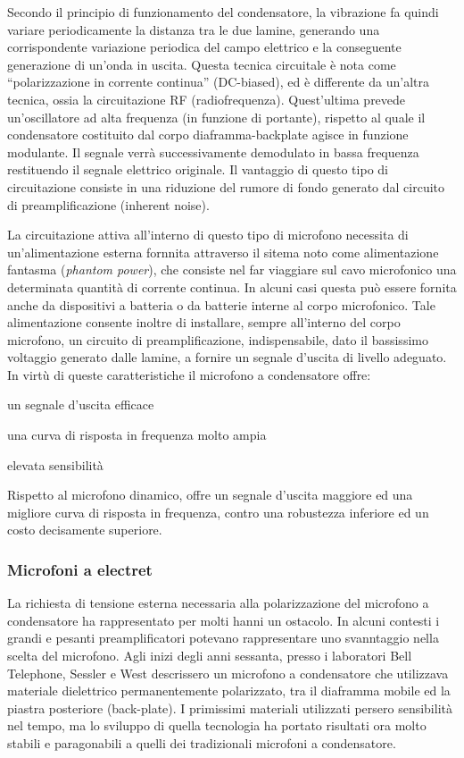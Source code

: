\begin{refsection}
Secondo il principio di funzionamento del condensatore, la vibrazione fa
quindi variare periodicamente la distanza tra le due lamine, generando una
corrispondente variazione periodica del campo elettrico e la conseguente
generazione di un’onda in uscita. Questa tecnica circuitale è nota come
“polarizzazione in corrente continua” (DC-biased), ed è differente da un’altra
tecnica, ossia la circuitazione RF (radiofrequenza). Quest’ultima prevede
un’oscillatore ad alta frequenza (in funzione di portante), rispetto al quale
il condensatore costituito dal corpo diaframma-backplate agisce in funzione
modulante. Il segnale verrà successivamente demodulato in bassa frequenza
restituendo il segnale elettrico originale. Il vantaggio di questo tipo di
circuitazione consiste in una riduzione del rumore di fondo generato dal
circuito di preamplificazione (inherent noise).

La circuitazione attiva all'interno di questo tipo di microfono necessita di
un'alimentazione esterna fornnita attraverso il sitema noto come alimentazione
fantasma (\emph{phantom power}), che consiste nel far viaggiare sul
cavo microfonico una determinata quantità di corrente continua. In alcuni casi
questa può essere fornita anche da dispositivi a batteria o da batterie interne
al corpo microfonico. Tale alimentazione consente inoltre di installare,
sempre all’interno del corpo microfono, un circuito di preamplificazione,
indispensabile, dato il bassissimo voltaggio generato dalle lamine, a fornire
un segnale d’uscita di livello adeguato.
In virtù di queste caratteristiche il microfono a condensatore offre:

\begin{compactitem}
  \item un segnale d'uscita efficace
  \item una curva di risposta in frequenza molto ampia
  \item elevata sensibilità
\end{compactitem}

Rispetto al microfono dinamico, offre un segnale d’uscita maggiore ed una migliore curva di
risposta in frequenza, contro una robustezza inferiore ed un costo decisamente superiore.

\subsubsection{Microfoni a electret}

La richiesta di tensione esterna necessaria alla polarizzazione del microfono a
condensatore ha rappresentato per molti hanni un ostacolo. In alcuni
contesti i grandi e pesanti preamplificatori potevano rappresentare uno svanntaggio
nella scelta del microfono. Agli inizi degli anni sessanta, presso i laboratori
Bell Telephone, Sessler e West descrissero un microfono a condensatore che utilizzava
materiale dielettrico permanentemente polarizzato, tra il diaframma mobile ed la
piastra posteriore (back-plate). I primissimi materiali utilizzati persero
sensibilità nel tempo, ma lo sviluppo di quella tecnologia ha portato risultati
ora molto stabili e paragonabili a quelli dei tradizionali microfoni a condensatore.


\end{refsection}
